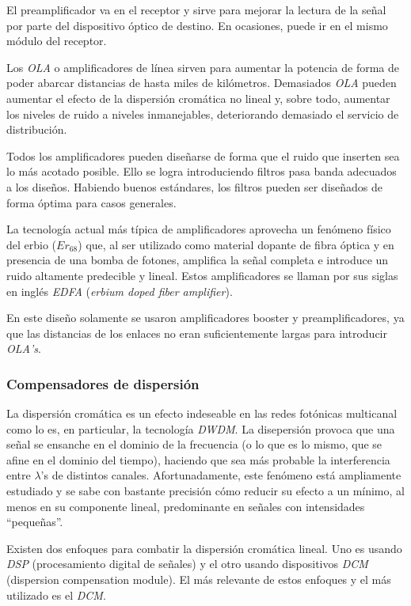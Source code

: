 El preamplificador va en el receptor y sirve para mejorar la lectura
de la señal por parte del dispositivo óptico de destino. En ocasiones,
puede ir en el mismo módulo del receptor.

Los \emph{OLA} o amplificadores de línea sirven para aumentar la
potencia de forma de poder abarcar distancias de hasta miles de
kilómetros. Demasiados \emph{OLA} pueden aumentar el efecto de la
dispersión cromática no lineal y, sobre todo, aumentar los niveles de
ruido a niveles inmanejables, deteriorando demasiado el servicio de
distribución.

Todos los amplificadores pueden diseñarse de forma que el ruido que
inserten sea lo más acotado posible. Ello se logra introduciendo
filtros pasa banda adecuados a los diseños. Habiendo buenos
estándares, los filtros pueden ser diseñados de forma óptima para
casos generales.

La tecnología actual más típica de amplificadores aprovecha un
fenómeno físico del erbio ($Er_{68}$) que, al ser utilizado como
material dopante de fibra óptica y en presencia de una bomba de
fotones, amplifica la señal completa e introduce un ruido altamente
predecible y lineal. Estos amplificadores se llaman por sus siglas en
inglés \emph{EDFA} (\emph{erbium doped fiber amplifier}).

En este diseño solamente se usaron amplificadores booster y
preamplificadores, ya que las distancias de los enlaces no eran
suficientemente largas para introducir \emph{OLA's}.

\subsubsection{Compensadores de dispersión}
\label{sec:dispersion}

La dispersión cromática es un efecto indeseable en las redes fotónicas
multicanal como lo es, en particular, la tecnología \emph{DWDM}. La
disepersión provoca que una señal se ensanche en el dominio de la
frecuencia (o lo que es lo mismo, que se afine en el dominio del
tiempo), haciendo que sea más probable la interferencia entre
$\lambda$'s de distintos canales. Afortunadamente, este fenómeno está
ampliamente estudiado y se sabe con bastante precisión cómo reducir su
efecto a un mínimo, al menos en su componente lineal, predominante en
señales con intensidades ``pequeñas''.

Existen dos enfoques para combatir la dispersión cromática lineal. Uno
es usando \emph{DSP} (procesamiento digital de señales) y el otro
usando dispositivos \emph{DCM} (dispersion compensation module). El
más relevante de estos enfoques y el más utilizado es el \emph{DCM}.

